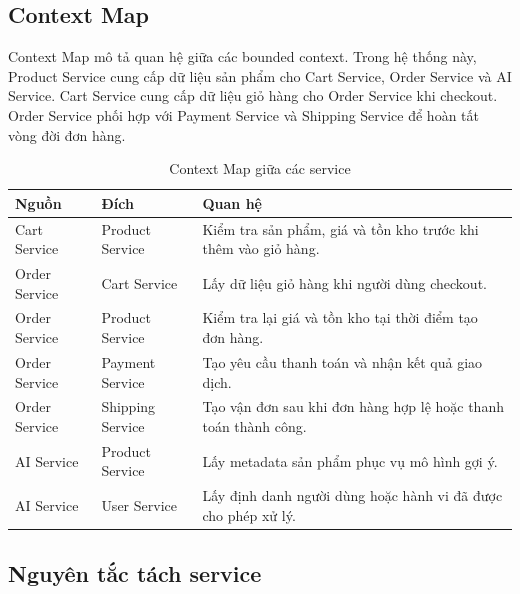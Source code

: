 \documentclass[../main.tex]{subfiles}
\begin{document}
\subsection{Context Map}
\label{subsection:2.2.3}

Context Map mô tả quan hệ giữa các bounded context. Trong hệ thống này, Product Service cung cấp dữ liệu sản phẩm cho Cart Service, Order Service và AI Service. Cart Service cung cấp dữ liệu giỏ hàng cho Order Service khi checkout. Order Service phối hợp với Payment Service và Shipping Service để hoàn tất vòng đời đơn hàng.

\begin{table}[H]
    \centering
    \caption{Context Map giữa các service}
    \label{tab:chapter2-context-map}
    \begin{tabular}{|p{}|p{}|p{}|}
        \hline
        \rowcolor{primary!35}
        \textbf{Nguồn} & \textbf{Đích} & \textbf{Quan hệ} \\
        \hline
        Cart Service & Product Service & Kiểm tra sản phẩm, giá và tồn kho trước khi thêm vào giỏ hàng. \\
        \hline
        Order Service & Cart Service & Lấy dữ liệu giỏ hàng khi người dùng checkout. \\
        \hline
        Order Service & Product Service & Kiểm tra lại giá và tồn kho tại thời điểm tạo đơn hàng. \\
        \hline
        Order Service & Payment Service & Tạo yêu cầu thanh toán và nhận kết quả giao dịch. \\
        \hline
        Order Service & Shipping Service & Tạo vận đơn sau khi đơn hàng hợp lệ hoặc thanh toán thành công. \\
        \hline
        AI Service & Product Service & Lấy metadata sản phẩm phục vụ mô hình gợi ý. \\
        \hline
        AI Service & User Service & Lấy định danh người dùng hoặc hành vi đã được cho phép xử lý. \\
        \hline
    \end{tabular}
\end{table}

\subsection{Nguyên tắc tách service}
\label{subsection:2.2.4}
\end{document}
